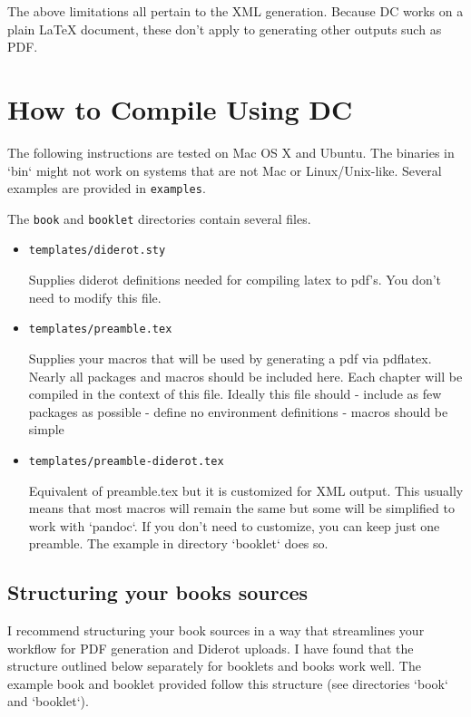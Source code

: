 \begin{remark}
The above limitations all pertain to the XML generation.  Because DC works on a plain LaTeX document, these don't apply to generating other outputs such as PDF. 
\end{remark}  

\section{How to Compile Using DC}

The following instructions are tested on Mac OS X and Ubuntu.  The binaries in `bin` might not work on systems that are not Mac or Linux/Unix-like.  Several  examples are provided in \lstinline`examples`.

The \lstinline`book` and \lstinline`booklet` directories contain several files.
%
\begin{itemize}
\item \lstinline`templates/diderot.sty`

   Supplies diderot definitions needed for compiling latex to pdf's.
   You don't need to modify this file.

\item \lstinline`templates/preamble.tex` 

   Supplies your macros that will be used by generating a pdf via pdflatex.  Nearly all packages and macros should be included here.  Each chapter will be compiled in the context of this file.  Ideally this file should
   - include as few packages as possible
   - define no environment definitions
   - macros should be simple

\item \lstinline`templates/preamble-diderot.tex` 

   Equivalent of preamble.tex but it is customized for XML output.  This usually means that most macros will remain the same but some will be simplified to work with `pandoc`.  If you don't need to customize, you can keep just one preamble.  The example in directory `booklet` does so.
\end{itemize}    

\subsection{Structuring your books sources}


I recommend structuring your book sources in a way that streamlines your workflow for PDF generation and Diderot uploads.  I have found that the structure outlined below separately for booklets and books work well.  The example book and booklet provided follow this structure (see directories `book` and `booklet`).

